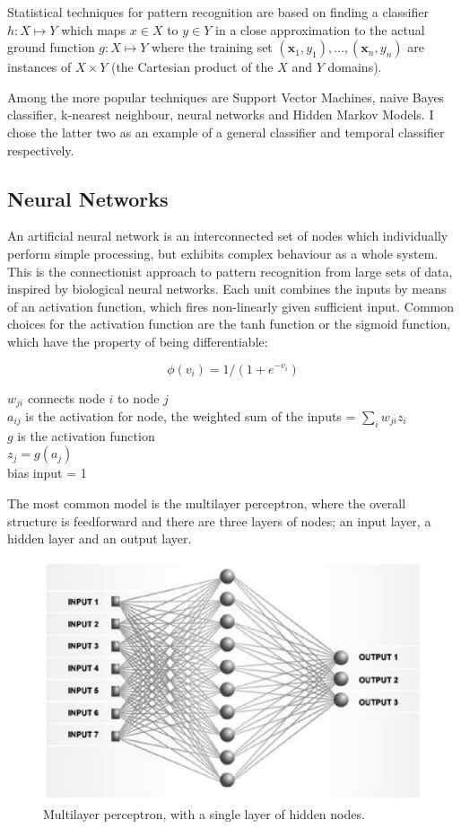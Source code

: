 \documentclass[12pt,a4,notitlepage]{report}
\renewcommand{\_}{\texttt{\symbol{95}}}
\newcommand{\<}{\texttt{\symbol{60}}}
\renewcommand{\>}{\texttt{\symbol{62}}}
\begin{document}
Statistical techniques for pattern recognition are based on finding a classifier
$ h: X \mapsto Y $ which maps $x \in X$ to $y \in Y$ in a close approximation to the actual ground function $ g: X \mapsto Y $ where the training set $ (\mathbf x_1,y_1), ... , (\mathbf x_n, y_n) $ are instances of $X \times Y$ (the Cartesian product of the $X$ and $Y$ domains).

Among the more popular techniques are Support Vector Machines, naive Bayes classifier, k-nearest neighbour, neural networks and Hidden Markov Models. I chose the latter two as an example of a general classifier and temporal classifier respectively.

\subsection{Neural Networks}

An artificial neural network is an interconnected set of nodes which individually perform simple processing, but exhibits complex behaviour as a whole system. This is the connectionist approach to pattern recognition from large sets of data, inspired by  biological neural networks. Each unit combines the inputs by means of an activation function, which fires non-linearly given sufficient input. Common choices for the activation function are the tanh function or the sigmoid function, which have the property of being differentiable:

\[ \phi(v_i) = 1/(1+e^{-v_i}) \]

$w_{ji}$ connects node $i$ to node $j$ \\
$a_{ij}$ is the activation for node, the weighted sum of the inputs = $\sum_i {w_{ji}z_i}$ \\
$g$ is the activation function \\
$z_j = g(a_j)$ \\
bias input = 1

The most common model is the multilayer perceptron, where the overall structure is feedforward and there are three layers of nodes; an input layer, a hidden layer and an output layer. 

\begin{figure}
\centering
\includegraphics[scale=0.6,angle=0]{diagrams/neural.ps}
\caption{Multilayer perceptron, with a single layer of hidden nodes.}
\label{mlp}
\end{figure}
\end{document}
